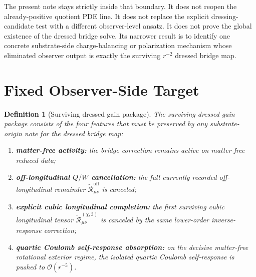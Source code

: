 \documentclass[11pt]{article}
\newcommand{\ReOff}{\widetilde{\mathcal R}_{\mu\nu}^{\mathrm{off}}}
\newcommand{\ReLongThree}{\widetilde{\mathcal R}_{\mu\nu}^{(\chi,3)}}
\newtheorem{definition}{Definition}
\begin{document}
The present note stays strictly inside that boundary. It does not reopen the already-positive quotient PDE line. It does not replace the explicit dressing-candidate test with a different observer-level ansatz. It does not prove the global existence of the dressed bridge solve. Its narrower result is to identify one concrete substrate-side charge-balancing or polarization mechanism whose eliminated observer output is exactly the surviving \(r^{-2}\) dressed bridge map.

\section{Fixed Observer-Side Target}

\begin{definition}[Surviving dressed gain package]
\label{def:gains}
The \emph{surviving dressed gain package} consists of the four features that must be preserved by any substrate-origin note for the dressed bridge map:
\begin{enumerate}
    \item \textbf{matter-free activity:} the bridge correction remains active on matter-free reduced data;
    \item \textbf{off-longitudinal \(Q/W\) cancellation:} the full currently recorded off-longitudinal remainder \(\ReOff\) is canceled;
    \item \textbf{explicit cubic longitudinal completion:} the first surviving cubic longitudinal tensor \(\ReLongThree\) is canceled by the same lower-order inverse-response correction;
    \item \textbf{quartic Coulomb self-response absorption:} on the decisive matter-free rotational exterior regime, the isolated quartic Coulomb self-response is pushed to \(\mathcal O(r^{-5})\).
\end{enumerate}
\end{definition}
\end{document}
